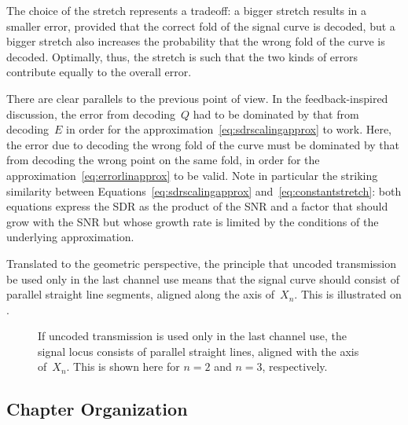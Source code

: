 The choice of the stretch represents a tradeoff: a bigger stretch results in a
smaller error, provided that the correct fold of the signal curve is decoded,
but a bigger stretch also increases the probability that the wrong fold of the
curve is decoded. Optimally, thus, the stretch is such that the two kinds of
errors contribute equally to the overall error. 

There are clear parallels to the previous point of view. In the
feedback-inspired discussion, the error from decoding~$Q$ had to be dominated by
that from decoding~$E$ in order for the
approximation~\eqref{eq:sdrscalingapprox} to work. Here, the error due to
decoding the wrong fold of the curve must be dominated by that from decoding the
wrong point on the same fold, in order for the
approximation~\eqref{eq:errorlinapprox} to be valid. Note in particular the
striking similarity between Equations~\ref{eq:sdrscalingapprox}
and~\ref{eq:constantstretch}: both equations express the SDR as the product of
the SNR and a factor that should grow with the SNR but whose growth rate is
limited by the conditions of the underlying approximation. 

Translated to the geometric perspective, the principle that uncoded transmission
be used only in the last channel use means that the signal curve should consist
of parallel straight line segments, aligned along the axis of~$X_n$. This is
illustrated on . 

\begin{figure}
  \centerline{%
  \subfloat[$n = 2$]{\label{fig:hybridlocus2}%
  }
  \hfil
  \subfloat[$n = 3$]{\label{fig:hybridlocus3}%
  }
  }
  \caption{If uncoded transmission is used only in the last channel use, the
  signal locus consists of parallel straight lines, aligned with the axis
  of~$X_n$. This is shown here for $n = 2$ and $n = 3$, respectively.}
  \label{fig:hybridlocus}
\end{figure}


\subsection{Chapter Organization}

